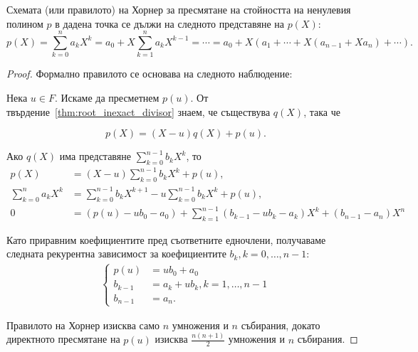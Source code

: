 \documentclass[numbers=endperiod, bibliography=totocnumbered]{scrartcl}
\begin{document}
\begin{proposition}
  Схемата (или правилото) на Хорнер за пресмятане на стойността на ненулевия полином \( p \) в дадена точка се дължи на следното представяне на \( p(X) \):
  \begin{equation*}
    p(X) = \sum_{k=0}^n a_k X^k = a_0 + X \sum_{k=1}^n a_k X^{k-1} = \cdots = a_0 + X (a_1 + \cdots + X(a_{n-1} + X a_n) + \cdots).
  \end{equation*}
\end{proposition}
\begin{proof}
  Формално правилото се основава на следното наблюдение:

  Нека \( u \in F \). Искаме да пресметнем \( p(u) \). От твърдение~\ref{thm:root_inexact_divisor} знаем, че съществува \( q(X) \), така че

  \begin{equation*}
    p(X) = (X - u) q(X) + p(u).
  \end{equation*}

  Ако \( q(X) \) има представяне \( \sum_{k=0}^{n-1} b_k X^k \), то
  \begin{align*}
    p(X)
    &=
    (X - u) \sum_{k=0}^{n-1} b_k X^k + p(u),
    \\
    \sum_{k=0}^n a_k X^k
    &=
    \sum_{k=0}^{n-1} b_k X^{k+1} - u \sum_{k=0}^{n-1} b_k X^k + p(u),
    \\
    0
    &=
    (p(u) - u b_0 - a_0) + \sum_{k=1}^{n-1} (b_{k-1} - u b_k - a_k) X^k + (b_{n-1} - a_n) X^n
  \end{align*}

  Като приравним коефициентите пред съответните едночлени, получаваме следната рекурентна зависимост за коефициентите \( b_k, k = 0, \ldots, n - 1 \):
  \begin{align*}
    \begin{cases}
      p(u) &= u b_0 + a_0 \\
      b_{k-1} &= a_k + u b_k, k = 1, \ldots, n - 1 \\
      b_{n-1} &= a_n.
    \end{cases}
  \end{align*}

  Правилото на Хорнер изисква само \( n \) умножения и \( n \) събирания, докато директното пресмятане на \( p(u) \) изисква \( \frac {n(n+1)} 2 \) умножения и \( n \) събирания.
\end{proof}
\end{document}
